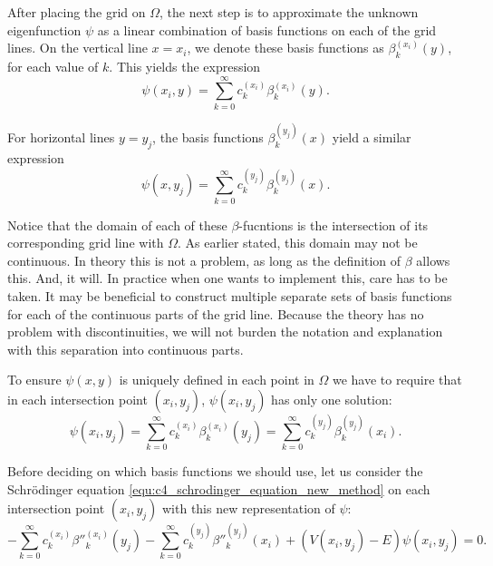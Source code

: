 After placing the grid on $\Omega$, the next step is to approximate the unknown eigenfunction $\psi$ as a linear combination of basis functions on each of the grid lines. On the vertical line $x = x_i$, we denote these basis functions as $\beta_k^{(x_i)}(y)$, for each value of $k$. This yields the expression
\begin{equation}\label{equ:c4_expression_on_lines_x}
    \psi(x_i, y) = \sum_{k=0}^\infty c_k^{(x_i)} \beta_k^{(x_i)}(y) \text{.}
\end{equation}

For horizontal lines $y = y_j$, the basis functions $\beta_k^{(y_j)}(x)$ yield a similar expression
\begin{equation}\label{equ:c4_expression_on_lines_y}
    \psi(x, y_j) = \sum_{k=0}^\infty c_k^{(y_j)} \beta_k^{(y_j)}(x) \text{.}
\end{equation}

Notice that the domain of each of these $\beta$-fucntions is the intersection of its corresponding grid line with $\Omega$. As earlier stated, this domain may not be continuous. In theory this is not a problem, as long as the definition of $\beta$ allows this. And, it will. In practice when one wants to implement this, care has to be taken. It may be beneficial to construct multiple separate sets of basis functions for each of the continuous parts of the grid line. Because the theory has no problem with discontinuities, we will not burden the notation and explanation with this separation into continuous parts.

To ensure $\psi(x, y)$ is uniquely defined in each point in $\Omega$ we have to require that in each intersection point $(x_i, y_j)$, $\psi(x_i, y_j)$ has only one solution:
\begin{equation}\label{equ:c4_new_method_pre_matrix_equality}
    \psi(x_i, y_j) = \sum_{k=0}^\infty c_k^{(x_i)} \beta_k^{(x_i)}(y_j) = \sum_{k=0}^\infty c_k^{(y_j)} \beta_k^{(y_j)}(x_i)\text{.}
\end{equation}

Before deciding on which basis functions we should use, let us consider the Schrödinger equation \eqref{equ:c4_schrodinger_equation_new_method} on each intersection point $(x_i, y_j)$ with this new representation of $\psi$:
$$
    -\sum_{k=0}^\infty c_k^{(x_i)} \beta''^{(x_i)}_k(y_j) - \sum_{k=0}^\infty c_k^{(y_j)} \beta''^{(y_j)}_k(x_i) + (V(x_i, y_j) - E) \psi(x_i, y_j) = 0\text{.}
$$

